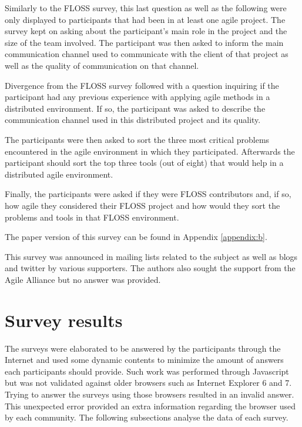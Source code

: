 \documentclass[lnbip]{svmultln}
\newcommand{\footnoterecall}[1]{
  \footnotemark[\value{#1}]
}
\begin{document}
Similarly to the FLOSS survey, this last question as well as the
following were only displayed to participants that had been in at
least one agile project. The survey kept on asking about the
participant's main role in the project and the size of the team
involved. The participant was then asked to inform the main
communication channel used to communicate with the client of that
project as well as the quality of communication on that channel.

Divergence from the FLOSS survey followed with a question inquiring if
the participant had any previous experience with applying agile
methods in a distributed environment. If so, the participant was asked
to describe the communication channel used in this distributed project
and its quality.

The participants were then asked to sort the three most critical
problems encountered in the agile environment in which they
participated. Afterwards the participant should sort the top three
tools (out of eight) that would help in a distributed agile
environment.

Finally, the participants were asked if they were FLOSS contributors
and, if so, how agile they considered their FLOSS project and how
would they sort the problems and tools in that FLOSS environment.

The paper version of this survey can be found in Appendix
\ref{appendix:b}.\footnoterecall{onlineoff}

This survey was announced in mailing lists related to the subject as
well as blogs and twitter by various supporters. The authors also
sought the support from the Agile Alliance but no answer was provided.

\section{Survey results}
\label{sec:results}

The surveys were elaborated to be answered by the participants through
the Internet and used some dynamic contents to minimize the amount of
answers each participants should provide. Such work was performed
through Javascript but was not validated against older browsers such
as Internet Explorer 6 and 7. Trying to answer the surveys using those
browsers resulted in an invalid answer. This unexpected error provided
an extra information regarding the browser used by each community. The
following subsections analyse the data of each survey.
\end{document}

